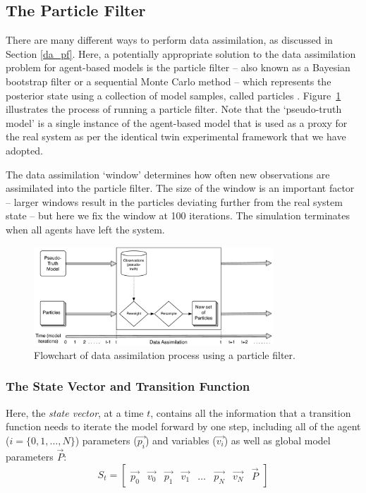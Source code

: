 \subsection{The Particle Filter\label{particle_filter}}

There are many different ways to perform data assimilation, as discussed in Section \ref{da_pf}. Here, a potentially appropriate solution to the data assimilation problem for agent-based models is the particle filter -- also known as a Bayesian bootstrap filter or a sequential Monte Carlo method -- which represents the posterior state using a collection of model samples, called particles \citep{gordon_novel_1993,carpenter_improved_1999,wang_data_2015, carrassi_data_2018}. Figure~\ref{fig:PF_flowchart} illustrates the process of running a particle filter. Note that the `pseudo-truth model' is a single instance of the agent-based model that is used as a proxy for the real system as per the identical twin experimental framework that we have adopted.

The data assimilation `window' determines how often new observations are assimilated into the particle filter. The size of the window is an important factor -- larger windows result in the particles deviating further from the real system state -- but here we fix the window at 100 iterations. The simulation terminates when all agents have left the system.

\begin{figure}[ht]
\centering
\includegraphics[width=0.8\textwidth]{figures/PF_flowchart2}
\caption{Flowchart of data assimilation process using a particle filter.\label{fig:PF_flowchart}}
\end{figure}

\subsubsection{The State Vector and Transition Function\label{state_vector}} 

Here, the \textit{state vector}, at a time $t$, contains all the information that a transition function needs to iterate the model forward by one step, including all of the agent ($i = \{ 0, 1, \dots, N \} $) parameters ($\overrightarrow{p_i}$) and variables ($\overrightarrow{v_i}$) as well as global model parameters $\overrightarrow{P}$:
\begin{equation}
  S_t  = \left[ \begin{array}{cccccccc}
\overrightarrow{p_0} & \overrightarrow{v_0} & \overrightarrow{p_1} &  \overrightarrow{v_1} &  \dots &  \overrightarrow{p_N} &  \overrightarrow{v_N} & \overrightarrow{P} 
\end{array} \right]
\end{equation} 

